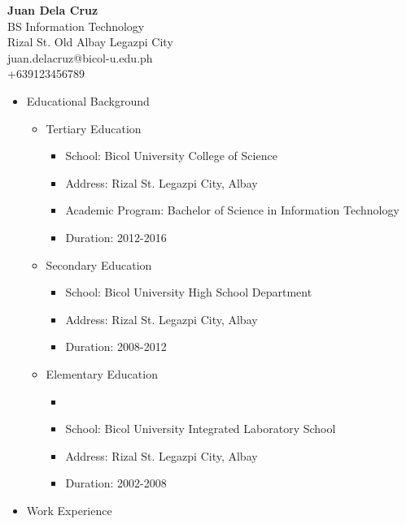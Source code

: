 
\begin{center}
    \textbf{\huge Juan Dela Cruz} \\
    BS Information Technology \\
    Rizal St. Old Albay Legazpi City \\
    juan.delacruz@bicol-u.edu.ph \\
    +639123456789
\end{center}

\begin{itemize}
    \item Educational Background
        \begin{itemize}
            \item Tertiary Education
                \begin{itemize}
                    \item School: Bicol University College of Science
                    \item Address: Rizal St. Legazpi City, Albay
                    \item Academic Program: Bachelor of Science in Information Technology
                    \item Duration: 2012-2016
                \end{itemize}
            \item Secondary Education
                \begin{itemize}
                    \item School: Bicol University High School Department
                    \item Address: Rizal St. Legazpi City, Albay
                    \item Duration: 2008-2012
                \end{itemize}
            \item Elementary Education
                \begin{itemize}
                    \item \item School: Bicol University Integrated Laboratory School
                    \item Address: Rizal St. Legazpi City, Albay
                    \item Duration: 2002-2008
                \end{itemize}
        \end{itemize}
    \item Work Experience
        \begin{itemize}

\end{itemize}
\end{itemize}
